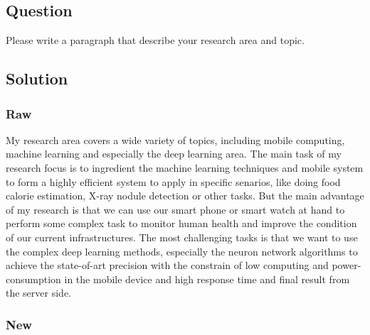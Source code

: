 \documentclass{article}
\begin{document}
\subsection{Question}
Please write a paragraph that describe your research area and topic.

\subsection{Solution}

\subsubsection{Raw}
My research area covers a wide variety of topics, including mobile computing, machine learning and especially the deep learning area. The main task of my research focus is to ingredient the machine learning techniques and mobile system to form a highly efficient system to apply in specific senarios, like doing food calorie estimation, X-ray nodule detection or other tasks. But the main advantage of my research is that we can use our smart phone or smart watch at hand to perform some complex task to monitor human health and improve the condition of our current infrastructures. The most challenging tasks is that we want to use the complex deep learning methods, especially the neuron network algorithms to achieve the state-of-art precision with the constrain of low computing and power-consumption in the mobile device and high response time and final result from the server side.


\subsubsection{New}
\end{document}
